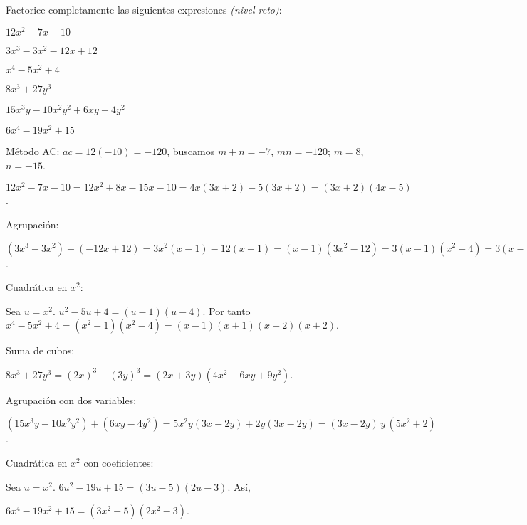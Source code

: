 \begin{exercise}
\problem Factorice completamente las siguientes expresiones \textit{(nivel reto)}:

\begin{exerciselist}
    \item $12x^2 - 7x - 10$
    \item $3x^3 - 3x^2 - 12x + 12$
    \item $x^4 - 5x^2 + 4$
    \item $8x^3 + 27y^3$
    \item $15x^3y - 10x^2y^2 + 6xy - 4y^2$
    \item $6x^4 - 19x^2 + 15$
\end{exerciselist}

\begin{solucion}
\begin{exerciselist}
    \item Método AC: $ac=12(-10)=-120$, buscamos $m+n=-7$, $mn=-120$; $m=8$, $n=-15$.
    
    $12x^2 - 7x - 10 = 12x^2 + 8x - 15x - 10 = 4x(3x+2) - 5(3x+2) = (3x+2)(4x-5)$.

    \item Agrupación:
    
    $(3x^3 - 3x^2) + (-12x + 12) = 3x^2(x - 1) - 12(x - 1) = (x - 1)(3x^2 - 12) = 3(x - 1)(x^2 - 4) = 3(x - 1)(x - 2)(x + 2)$.

    \item Cuadrática en $x^2$:
    
    Sea $u=x^2$. $u^2 - 5u + 4 = (u - 1)(u - 4)$. Por tanto $x^4 - 5x^2 + 4 = (x^2 - 1)(x^2 - 4) = (x - 1)(x + 1)(x - 2)(x + 2)$.

    \item Suma de cubos:
    
    $8x^3 + 27y^3 = (2x)^3 + (3y)^3 = (2x + 3y)(4x^2 - 6xy + 9y^2)$.

    \item Agrupación con dos variables:
    
    $(15x^3y - 10x^2y^2) + (6xy - 4y^2) = 5x^2y(3x - 2y) + 2y(3x - 2y) = (3x - 2y)\,y\,(5x^2 + 2)$.

    \item Cuadrática en $x^2$ con coeficientes:
    
    Sea $u=x^2$. $6u^2 - 19u + 15 = (3u - 5)(2u - 3)$. Así,
    
    $6x^4 - 19x^2 + 15 = (3x^2 - 5)(2x^2 - 3)$.
\end{exerciselist}
\end{solucion}
\end{exercise}

